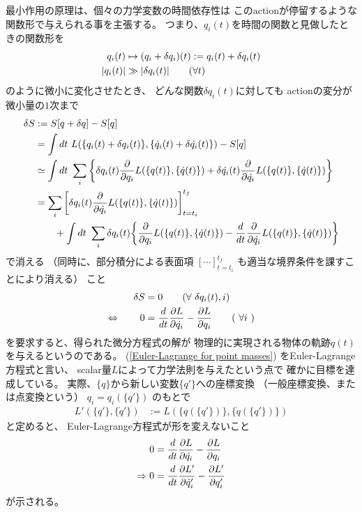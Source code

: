 最小作用の原理は、個々の力学変数の時間依存性は
このactionが停留するような関数形で与えられる事を主張する。
つまり、$q_i(t)$を時間の関数と見做したときの関数形を
\begin{align}
  q_i(t) &\mapsto (q_i+\delta q_i)(t) := q_i(t) + \delta q_i(t)
  \\
  | q_i(t) | & \gg | \delta q_i(t) |
  \qquad (\forall t)
\notag
\end{align}
のように微小に変化させたとき、
どんな関数$\delta q_i(t)$に対しても
actionの変分が微小量の$1$次まで
\begin{align}
  \delta S &:=
  S[q + \delta q] - S[q]
\notag\\&=
  \int dt\ L(\{ q_i(t) + \delta q_i(t) \},
  \{ \dot{q}_i(t) + \delta \dot{q_i}(t) \} )
  - S[q]
\notag\\&\simeq
  \int dt\ \sum_i
  \bigg\{
    \delta q_i(t)
    \dfrac{\partial}{\partial q_i}
    L(\{ q(t) \},
    \{ \dot{q}(t) \} )
+
    \delta \dot{q_i}(t)
    \dfrac{\partial}{\partial \dot{q_i}}
    L(\{ q(t) \},
    \{ \dot{q}(t) \} )
  \bigg\}
\notag\\&=
  \sum_i
  \bigg[
    \delta q_i(t)
    \dfrac{\partial}{\partial \dot{q_i}}
    L(\{ q(t) \},
    \{ \dot{q}(t) \} )
  \bigg]_{t=t_i}^{t_f}
\notag\\&\qquad
  +
\int dt\ \sum_i
\delta q_i(t)
\bigg\{
  \dfrac{\partial}{\partial q_i}
  L(\{ q(t) \},
  \{ \dot{q}(t) \} )
-
  \dfrac{d}{dt}
  \dfrac{\partial}{\partial \dot{q_i}}
  L(\{ q(t) \},
  \{ \dot{q}(t) \} )
\bigg\}
\label{variation of action}
\end{align}
で消える
（同時に、部分積分による表面項
$[\cdots]_{t=t_i}^{t_f}$
も適当な境界条件を課すことにより消える）
こと
\begin{align}
  \delta S &= 0
  \qquad (\forall\ \delta q_i(t), i)
\notag\\\Leftrightarrow\qquad
  0 &=
  \dfrac{d}{dt}\dfrac{\partial L}{\partial \dot{q_i} }
  - \dfrac{\partial L}{\partial q_i }
  \qquad (\ \forall i\ )
\label{Euler-Lagrange for point masses}
\end{align}
を要求すると、得られた微分方程式の解が
物理的に実現される物体の軌跡${q(t)}$
を与えるというのである。
(\ref{Euler-Lagrange for point masses})
をEuler-Lagrange方程式と言い、
scalar量$L$によって力学法則を与えたという点で
確かに目標を達成している。
実際、$\{q\}$から新しい変数$\{ q'\}$への座標変換
（一般座標変換、または点変換という）
$q_i = q_i(\{q'\})$
のもとで
\begin{align}
  L'(\{q'\}, \{\dot{q}'\}) &:= L(\{q(\{q'\})\}, \{\dot{q}(\{q'\})\})
\end{align}
と定めると、
Euler-Lagrange方程式が形を変えないこと
\begin{align}
  0 &=
  \dfrac{d}{dt}\dfrac{\partial L}{\partial \dot{q_i} }
  - \dfrac{\partial L}{\partial q_i }
\notag\\\Rightarrow
0 &=
\dfrac{d}{dt}\dfrac{\partial L'}{\partial \dot{q}'_i }
- \dfrac{\partial L'}{\partial q_i' }
\label{point transformation}
\end{align}
が示される。

